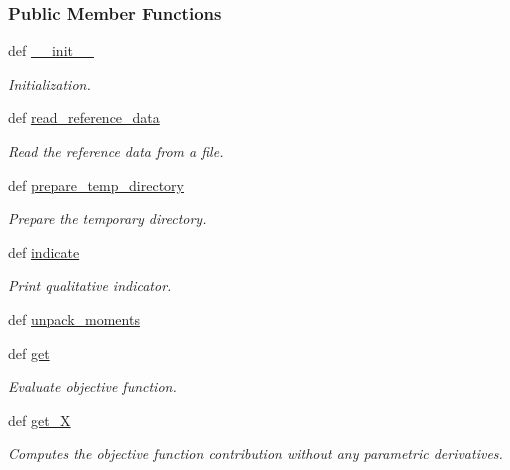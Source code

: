 \subsubsection*{Public Member Functions}
\begin{DoxyCompactItemize}
\item 
def \hyperlink{classforcebalance_1_1moments_1_1Moments_a3f960d346e9573adc3d2c46c4568c779}{\-\_\-\-\_\-init\-\_\-\-\_\-}
\begin{DoxyCompactList}\small\item\em Initialization. \end{DoxyCompactList}\item 
def \hyperlink{classforcebalance_1_1moments_1_1Moments_a2048e58340147becb826702f61442227}{read\-\_\-reference\-\_\-data}
\begin{DoxyCompactList}\small\item\em Read the reference data from a file. \end{DoxyCompactList}\item 
def \hyperlink{classforcebalance_1_1moments_1_1Moments_a0cf19932924e283f8b54fc1524446e4a}{prepare\-\_\-temp\-\_\-directory}
\begin{DoxyCompactList}\small\item\em Prepare the temporary directory. \end{DoxyCompactList}\item 
def \hyperlink{classforcebalance_1_1moments_1_1Moments_a2f51fa0fb20454ef3eb51b99e2ad103c}{indicate}
\begin{DoxyCompactList}\small\item\em Print qualitative indicator. \end{DoxyCompactList}\item 
def \hyperlink{classforcebalance_1_1moments_1_1Moments_a57f58da1365a48fbca1267e9f7228ab8}{unpack\-\_\-moments}
\item 
def \hyperlink{classforcebalance_1_1moments_1_1Moments_a488308fb94a59f876efecb115b2e60b3}{get}
\begin{DoxyCompactList}\small\item\em Evaluate objective function. \end{DoxyCompactList}\item 
def \hyperlink{classforcebalance_1_1target_1_1Target_a606dd136f195c267c05a2455405e5949}{get\-\_\-\-X}
\begin{DoxyCompactList}\small\item\em Computes the objective function contribution without any parametric derivatives. \end{DoxyCompactList}\item 

\end{DoxyCompactItemize}
